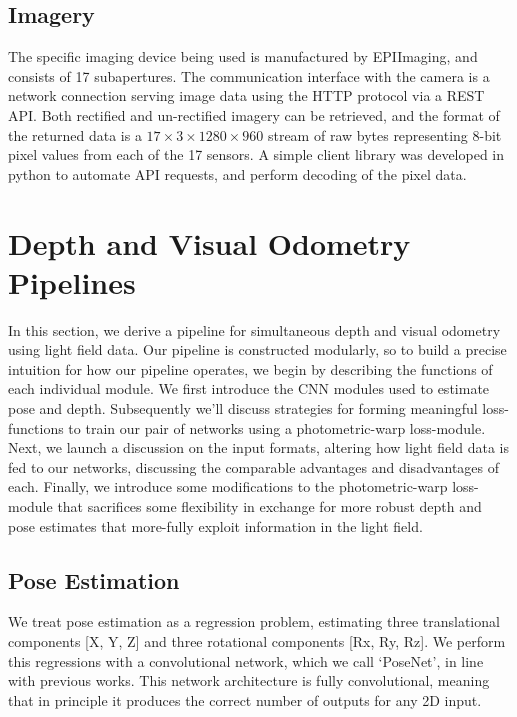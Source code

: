 \subsection{Imagery}
The specific imaging device being used is manufactured by EPIImaging, and consists of 17 subapertures. The communication interface with the camera is a network connection serving image data using the HTTP protocol via a REST API. Both rectified and un-rectified imagery can be retrieved, and the format of the returned data is a $17\times 3 \times 1280 \times 960$ stream of raw bytes representing 8-bit pixel values from each of the 17 sensors. A simple client library was developed in python to automate API requests, and perform decoding of the pixel data.

\newpage

\section{Depth and Visual Odometry Pipelines}
In this section, we derive a pipeline for simultaneous depth and visual odometry using light field data. Our pipeline is constructed modularly, so to build a precise intuition for how our pipeline operates, we begin by describing the functions of each individual module. We first introduce the CNN modules used to estimate pose and depth. Subsequently we'll discuss strategies for forming meaningful loss-functions to train our pair of networks using a photometric-warp loss-module. Next, we launch a discussion on the input formats, altering how light field data is fed to our networks, discussing the comparable advantages and disadvantages of each. Finally, we introduce some modifications to the photometric-warp loss-module that sacrifices some flexibility in exchange for more robust depth and pose estimates that more-fully exploit information in the light field. 

\subsection{Pose Estimation}

We treat pose estimation as a regression problem, estimating three translational components [X, Y, Z] and three rotational components [Rx, Ry, Rz]. We perform this regressions with a convolutional network, which we call `PoseNet', in line with previous works. This network architecture is fully convolutional, meaning that in principle it produces the correct number of outputs for any 2D input.

